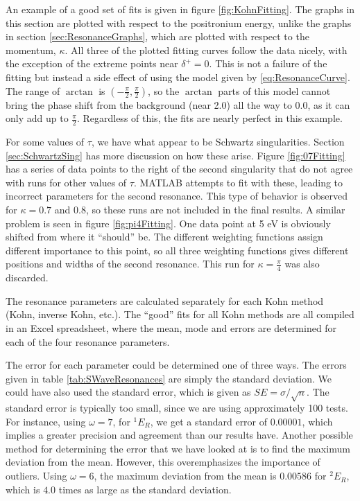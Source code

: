 \documentclass[Dissertation.tex]{subfiles}
\begin{document}
An example of a good set of fits is given in figure \ref{fig:KohnFitting}.  The graphs in this section are plotted with respect to the positronium energy, unlike the graphs in section \ref{sec:ResonanceGraphs}, which are plotted with respect to the momentum, $\kappa$.  All three of the plotted fitting curves follow the data nicely, with the exception of the extreme points near $\delta^+ = 0$.  This is not a failure of the fitting but instead a side effect of using the model given by \ref{eq:ResonanceCurve}.  The range of $\arctan$ is $(-\frac{\pi}{2},\frac{\pi}{2})$, so the $\arctan$ parts of this model cannot bring the phase shift from the background (near 2.0) all the way to 0.0, as it can only add up to $\frac{\pi}{2}$.  Regardless of this, the fits are nearly perfect in this example.

For some values of $\tau$, we have what appear to be Schwartz singularities.  Section \ref{sec:SchwartzSing} has more discussion on how these arise.  Figure \ref{fig:07Fitting} has a series of data points to the right of the second singularity that do not agree with runs for other values of $\tau$.  MATLAB attempts to fit with these, leading to incorrect parameters for the second resonance.  This type of behavior is observed for $\kappa = 0.7$ and $0.8$, so these runs are not included in the final results.  A similar problem is seen in figure \ref{fig:pi4Fitting}.  One data point at 5 eV is obviously shifted from where it ``should'' be.  The different weighting functions assign different importance to this point, so all three weighting functions gives different positions and widths of the second resonance.  This run for $\kappa = \frac{\pi}{4}$ was also discarded. 

The resonance parameters are calculated separately for each Kohn method (Kohn, inverse Kohn, etc.).  The ``good'' fits for all Kohn methods are all compiled in an Excel spreadsheet, where the mean, mode and errors are determined for each of the four resonance parameters.

The error for each parameter could be determined one of three ways.  The errors given in table \ref{tab:SWaveResonances} are simply the standard deviation.  We could have also used the standard error, which is given as $SE = \sigma / \sqrt{n}$.  The standard error is typically too small, since we are using approximately 100 tests.  For instance, using $\omega = 7$, for $^1E_R$, we get a standard error of $0.00001$, which implies a greater precision and agreement than our results have.  Another possible method for determining the error that we have looked at is to find the maximum deviation from the mean.  However, this overemphasizes the importance of outliers.  Using $\omega = 6$, the maximum deviation from the mean is $0.00586$ for $^2E_R$, which is $4.0$ times as large as the standard deviation. 
\end{document}
